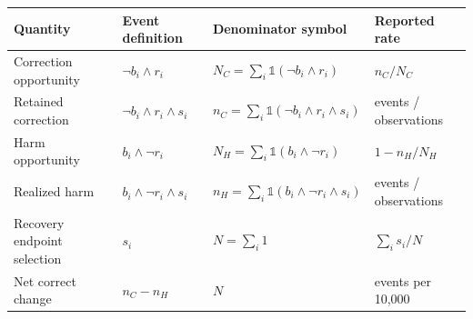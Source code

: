 \begin{tabular}{llll}
\toprule
Quantity & Event definition & Denominator symbol & Reported rate \\
\midrule
Correction opportunity & $\neg b_i\wedge r_i$ & $N_C=\sum_i\mathbb{1}(\neg b_i\wedge r_i)$ & $n_C/N_C$ \\
Retained correction & $\neg b_i\wedge r_i\wedge s_i$ & $n_C=\sum_i\mathbb{1}(\neg b_i\wedge r_i\wedge s_i)$ & events / observations \\
Harm opportunity & $b_i\wedge\neg r_i$ & $N_H=\sum_i\mathbb{1}(b_i\wedge\neg r_i)$ & $1-n_H/N_H$ \\
Realized harm & $b_i\wedge\neg r_i\wedge s_i$ & $n_H=\sum_i\mathbb{1}(b_i\wedge\neg r_i\wedge s_i)$ & events / observations \\
Recovery endpoint selection & $s_i$ & $N=\sum_i1$ & $\sum_i s_i/N$ \\
Net correct change & $n_C-n_H$ & $N$ & events per 10,000 \\
\bottomrule
\end{tabular}
